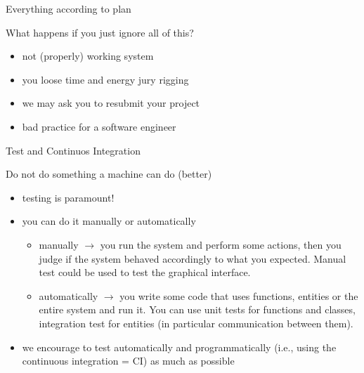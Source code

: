 \documentclass[presentation]{beamer}\mode<presentation>{\usetheme{AMSBolognaFC}}
\begin{document}
\begin{frame}[c,allowframebreaks]{Everything according to plan}
    \begin{block}{What happens if you just ignore all of this?}
        \begin{itemize}
            \item not (properly) working system
            \item you loose time and energy jury rigging
            \item we may ask you to resubmit your project
            \item bad practice for a software engineer
        \end{itemize}
    \end{block}
\end{frame}

\begin{frame}[c,allowframebreaks]{Test and Continuos Integration}
    
    \begin{block}{Do not do something a machine can do (better)}
        \begin{itemize}
            \item \alert{testing is paramount!}
            \item you can do it manually or automatically
            \begin{itemize}
                \item manually $\rightarrow$ you run the system and perform some actions, then you judge if the system behaved accordingly to what you expected.
                Manual test could be used to test the graphical interface.
                \item automatically $\rightarrow$ you write some code that uses functions, entities or the entire system and run it.
                You can use unit tests for functions and classes, integration test for entities (in particular communication between them).
            \end{itemize}
            \item we encourage to test automatically and programmatically (i.e., using the continuous integration = CI) as much as possible
        \end{itemize}
    \end{block}
    
    \framebreak
    

\end{frame}
\end{document}
